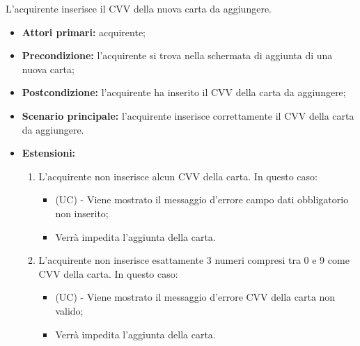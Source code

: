 L'acquirente inserisce il CVV della nuova carta da aggiungere.
\begin{itemize}
    \item \textbf{Attori primari:} acquirente;
    \item \textbf{Precondizione:} l'acquirente si trova nella schermata di aggiunta di una nuova carta;
    \item \textbf{Postcondizione:} l'acquirente ha inserito il CVV della carta da aggiungere;
    \item \textbf{Scenario principale:} l'acquirente inserisce correttamente il CVV della carta da aggiungere.
    \item \textbf{Estensioni:}
    \begin{enumerate}[label=\lett]
        \item L'acquirente non inserisce alcun CVV della carta. In questo caso:
        \begin{itemize}
            \item (UC) - Viene mostrato il messaggio d'errore campo dati obbligatorio non inserito;
            \item Verrà impedita l'aggiunta della carta.
        \end{itemize}
        \item L'acquirente non inserisce esattamente 3 numeri compresi tra 0 e 9 come CVV della carta. In questo caso:
        \begin{itemize}
            \item (UC) - Viene mostrato il messaggio d'errore CVV della carta non valido;
            \item Verrà impedita l'aggiunta della carta.
        \end{itemize}
    \end{enumerate}
\end{itemize}

